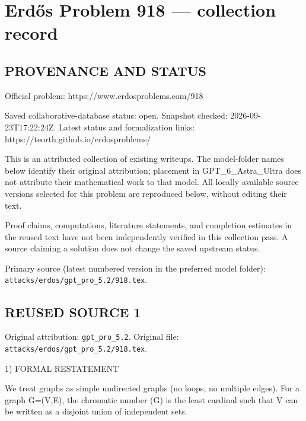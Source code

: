 \section*{Erd\H{o}s Problem 918 --- collection record}

\subsection*{PROVENANCE AND STATUS}
Official problem: https://www.erdosproblems.com/918

Saved collaborative-database status: open.
Snapshot checked: 2026-09-23T17:22:24Z.
Latest status and formalization links: https://teorth.github.io/erdosproblems/

This is an attributed collection of existing writeups. The model-folder names below identify their original attribution; placement in GPT\_6\_Astra\_Ultra does not attribute their mathematical work to that model. All locally available source versions selected for this problem are reproduced below, without editing their text.

Proof claims, computations, literature statements, and completion estimates in the reused text have not been independently verified in this collection pass. A source claiming a solution does not change the saved upstream status.

Primary source (latest numbered version in the preferred model folder): \texttt{attacks/erdos/gpt\_pro\_5.2/918.tex}.

\subsection*{REUSED SOURCE 1}
Original attribution: \texttt{gpt\_pro\_5.2}.
Original file: \texttt{attacks/erdos/gpt\_pro\_5.2/918.tex}.


1) FORMAL RESTATEMENT

We treat graphs as simple undirected graphs (no loops, no multiple edges).
For a graph G=(V,E), the chromatic number \chi(G) is the least cardinal \kappa such that V can be written as a disjoint union of \kappa independent sets.

